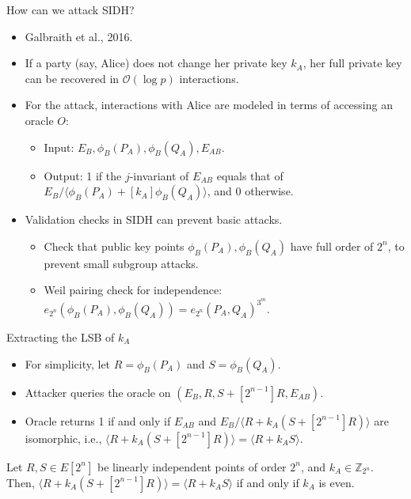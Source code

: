 \documentclass{beamer}
\begin{document}
\begin{frame}{How can we attack SIDH?}
    \begin{itemize}
        \item Galbraith et al., 2016.
        \item If a party (say, Alice) does not change her private key $k_A$, her full private key can be recovered in $\mathcal{O}(\log p)$ interactions.
        \item For the attack, interactions with Alice are modeled in terms of accessing an oracle $O$:
        \begin{itemize}
            \item Input: $E_B, \phi_B(P_A), \phi_B(Q_A), E_{AB}$.
            \item Output: 1 if the $j$-invariant of $E_{AB}$ equals that of $E_B/\langle \phi_B(P_A)+[k_A]\phi_B(Q_A)\rangle$, and 0 otherwise.
        \end{itemize}
        \item Validation checks in SIDH can prevent basic attacks.
        \begin{itemize}
            \item Check that public key points $\phi_B(P_A), \phi_B(Q_A)$ have full order of $2^n$, to prevent small subgroup attacks.
            \item Weil pairing check for independence: $e_{2^n}(\phi_B(P_A),\phi_B(Q_A)) = e_{2^n}(P_A,Q_A)^{3^m}$.
        \end{itemize}
    \end{itemize}
\end{frame}

\begin{frame}{Extracting the LSB of $k_A$}
    \begin{itemize}
        \item For simplicity, let $R = \phi_B(P_A)$ and $S = \phi_B(Q_A)$.
        \item Attacker queries the oracle on $(E_B, R, S+[2^{n-1}]R, E_{AB})$.
        \item Oracle returns 1 if and only if $E_{AB}$ and $E_B/\langle R+k_A(S+[2^{n-1}]R)\rangle$ are isomorphic, i.e., $\langle R+k_A(S+[2^{n-1}]R)\rangle = \langle R+k_A S\rangle$.
    \end{itemize}
    \begin{lemma}
        Let $R,S\in E[2^n]$ be linearly independent points of order $2^n$, and $k_A\in\mathbb{Z}_{2^n}$. Then, $\langle R+k_A(S+[2^{n-1}]R)\rangle = \langle R+k_A S\rangle$ if and only if $k_A$ is even.
    \end{lemma}
\end{frame}
\end{document}
